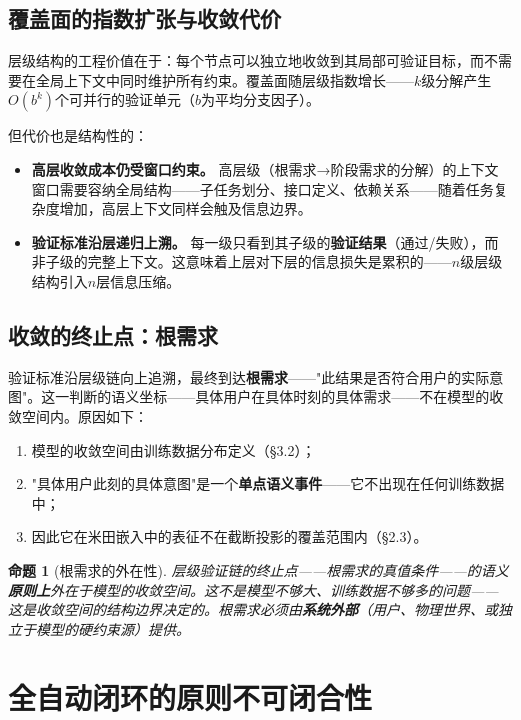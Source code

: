\documentclass[11pt,a4paper]{ctexart}
\newtheorem{proposition}[theorem]{命题}
\begin{document}
\subsection{覆盖面的指数扩张与收敛代价}

层级结构的工程价值在于：每个节点可以独立地收敛到其局部可验证目标，而不需要在全局上下文中同时维护所有约束。覆盖面随层级指数增长——$k$级分解产生$O(b^k)$个可并行的验证单元（$b$为平均分支因子）。

但代价也是结构性的：

\begin{itemize}[leftmargin=*]
    \item \textbf{高层收敛成本仍受窗口约束。} 高层级（根需求→阶段需求的分解）的上下文窗口需要容纳全局结构——子任务划分、接口定义、依赖关系——随着任务复杂度增加，高层上下文同样会触及信息边界。
    \item \textbf{验证标准沿层递归上溯。} 每一级只看到其子级的\textbf{验证结果}（通过/失败），而非子级的完整上下文。这意味着上层对下层的信息损失是累积的——$n$级层级结构引入$n$层信息压缩。
\end{itemize}

\subsection{收敛的终止点：根需求}

验证标准沿层级链向上追溯，最终到达\textbf{根需求}——"此结果是否符合用户的实际意图"。这一判断的语义坐标——具体用户在具体时刻的具体需求——不在模型的收敛空间内。原因如下：

\begin{enumerate}[leftmargin=*]
    \item 模型的收敛空间由训练数据分布定义（§3.2）；
    \item "具体用户此刻的具体意图"是一个\textbf{单点语义事件}——它不出现在任何训练数据中；
    \item 因此它在米田嵌入中的表征不在截断投影的覆盖范围内（§2.3）。
\end{enumerate}

\begin{proposition}[根需求的外在性]
    层级验证链的终止点——根需求的真值条件——的语义\textbf{原则上}外在于模型的收敛空间。这不是模型不够大、训练数据不够多的问题——这是收敛空间的结构边界决定的。根需求必须由\textbf{系统外部}（用户、物理世界、或独立于模型的硬约束源）提供。
\end{proposition}


\section{全自动闭环的原则不可闭合性}
\end{document}

